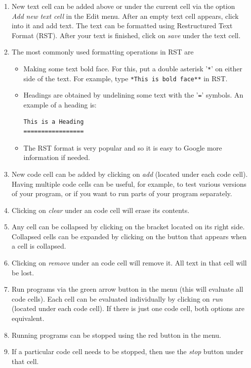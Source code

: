 \begin{enumerate} 
\item New text cell can be added above or under the current cell via the option 
      {\em Add new text cell} in the Edit menu. 
      After an empty text cell appears, click into it and add text. The text can be 
      formatted using Restructured Text Format (RST). After your text is finished, click 
      on {\em save} under the text cell. 
\item The most commonly used formatting operations in RST are 
      \begin{itemize}
      \item Making some text bold face. For this, put a double asterisk '{\tt **}' on either 
      side of the text. For example, type {\tt **This is bold face**} in RST.
      \item Headings are obtained by undelining some text with the '{\tt =}' symbols.
      An example of a heading is:
\begin{verbatim}
This is a Heading
=================
\end{verbatim}
      \item The RST format is very popular and so it is easy to Google more information
      if needed.
      \end{itemize}
\item New code cell can be added by clicking on {\em add} (located under each code cell). 
      Having multiple code cells can be useful, for example, to test various versions 
      of your program, or if you want to run parts of your program separately. 
\item Clicking on {\em clear} under an code cell will erase its contents.
\item Any cell can be collapsed by clicking on the bracket located on its right side. Collapsed
      cells can be expanded by clicking on the button that appears when a cell is 
      collapsed.
\item Clicking on {\em remove} under an code cell will remove it. All text in that cell will be lost.
\item Run programs via the green arrow button in the menu (this will evaluate all code
      cells). Each cell can be evaluated individually by clicking on {\em run} (located under 
      each code cell). If there is just one code cell, both options are equivalent.
\item Running programs can be stopped using the red button in the menu. 
\item If a particular
      code cell needs to be stopped, then use the {\em stop} button under that cell.
\end{enumerate}

